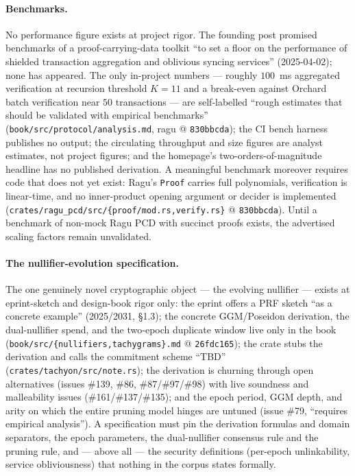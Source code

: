 \documentclass[11pt,a4paper]{article}
\theoremstyle{definition}
\begin{document}
\paragraph{Benchmarks.} No performance figure exists at project rigor. The
founding post promised benchmarks of a proof-carrying-data toolkit ``to set
a floor on the performance of shielded transaction aggregation and
oblivious syncing services'' (2025-04-02); none has appeared. The only
in-project numbers --- roughly $100$~ms aggregated verification at
recursion threshold $K = 11$ and a break-even against Orchard batch
verification near $50$ transactions --- are self-labelled ``rough estimates
that should be validated with empirical benchmarks''
(\texttt{book/src/protocol/analysis.md}, ragu @ \texttt{830bbcda}); the CI
bench harness publishes no output; the circulating throughput and size
figures are analyst estimates, not project figures; and the homepage's
two-orders-of-magnitude headline has no published derivation. A meaningful
benchmark moreover requires code that does not yet exist: Ragu's
\texttt{Proof} carries full polynomials, verification is linear-time, and
no inner-product opening argument or decider is implemented
(\texttt{crates/ragu\_pcd/src/\{proof/mod.rs,verify.rs\}} @
\texttt{830bbcda}). Until a benchmark of non-mock Ragu PCD with succinct
proofs exists, the advertised scaling factors remain unvalidated.

\paragraph{The nullifier-evolution specification.} The one genuinely novel
cryptographic object --- the evolving nullifier --- exists at
eprint-sketch and design-book rigor only: the eprint offers a PRF sketch
``as a concrete example'' (2025/2031, \S1.3); the concrete GGM/Poseidon
derivation, the dual-nullifier spend, and the two-epoch duplicate window
live only in the book (\texttt{book/src/\{nullifiers,tachygrams\}.md} @
\texttt{26fdc165}); the crate stubs the derivation and calls the commitment
scheme ``TBD'' (\texttt{crates/tachyon/src/note.rs}); the derivation is
churning through open alternatives (issues \#139, \#86, \#87/\#97/\#98)
with live soundness and malleability issues (\#161/\#137/\#135); and the
epoch period, GGM depth, and arity on which the entire pruning model hinges
are untuned (issue \#79, ``requires empirical analysis''). A specification
must pin the derivation formulas and domain separators, the epoch
parameters, the dual-nullifier consensus rule and the pruning rule, and ---
above all --- the security definitions (per-epoch unlinkability, service
obliviousness) that nothing in the corpus states formally.
\end{document}
